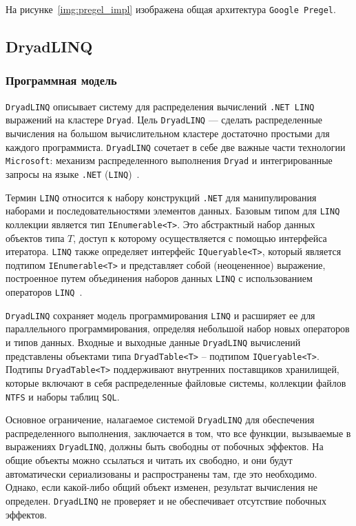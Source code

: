 На рисунке~\ref{img:pregel_impl} изображена общая архитектура \texttt{Google Pregel}.


\subsection{DryadLINQ}

\subsubsection{Программная модель}

\texttt{DryadLINQ} описывает систему для распределения вычислений \texttt{.NET LINQ} выражений на кластере \texttt{Dryad}.
Цель \texttt{DryadLINQ} --- сделать распределенные вычисления на большом вычислительном кластере достаточно простыми для каждого программиста. 
\texttt{DryadLINQ} сочетает в себе две важные части технологии \texttt{Microsoft}: механизм распределенного выполнения \texttt{Dryad} и интегрированные запросы на языке \texttt{.NET} (\texttt{LINQ})~\cite{microsoft-dryad}.

Термин \texttt{LINQ} относится к набору конструкций \texttt{.NET} для манипулирования наборами и последовательностями элементов данных.
Базовым типом для \texttt{LINQ} коллекции является тип \texttt{IEnumerable<T>}. 
Это абстрактный набор данных объектов типа $T$, доступ к которому осуществляется с помощью интерфейса итератора. 
\texttt{LINQ} также определяет интерфейс \texttt{IQueryable<T>}, который является подтипом \texttt{IEnumerable<T>} и представляет собой (неоцененное) выражение, построенное путем объединения наборов данных \texttt{LINQ} с использованием операторов \texttt{LINQ}~\cite{267963}.

\texttt{DryadLINQ} сохраняет модель программирования \texttt{LINQ} и расширяет ее для параллельного программирования, определяя небольшой набор новых операторов и типов данных.
Входные и выходные данные \texttt{DryadLINQ} вычислений представлены объектами типа \texttt{DryadTable<T>} -- подтипом \texttt{IQueryable<T>}. 
Подтипы \texttt{DryadTable<T>} поддерживают внутренних поставщиков хранилищей, которые включают в себя распределенные файловые системы, коллекции файлов \texttt{NTFS} и наборы таблиц \texttt{SQL}.

Основное ограничение, налагаемое системой \texttt{DryadLINQ} для обеспечения распределенного выполнения, заключается в том, что все функции, вызываемые в выражениях \texttt{DryadLINQ}, должны быть свободны от побочных эффектов. 
На общие объекты можно ссылаться и читать их свободно, и они будут автоматически сериализованы и распространены там, где это необходимо. 
Однако, если какой-либо общий объект изменен, результат вычисления не определен. 
\texttt{DryadLINQ} не проверяет и не обеспечивает отсутствие побочных эффектов.


